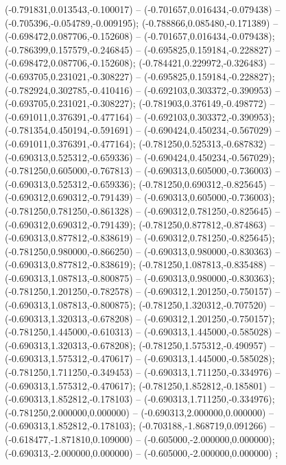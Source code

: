  (-0.791831,0.013543,-0.100017) -- (-0.701657,0.016434,-0.079438) -- (-0.705396,-0.054789,-0.009195);
 (-0.788866,0.085480,-0.171389) -- (-0.698472,0.087706,-0.152608) -- (-0.701657,0.016434,-0.079438);
 (-0.786399,0.157579,-0.246845) -- (-0.695825,0.159184,-0.228827) -- (-0.698472,0.087706,-0.152608);
 (-0.784421,0.229972,-0.326483) -- (-0.693705,0.231021,-0.308227) -- (-0.695825,0.159184,-0.228827);
 (-0.782924,0.302785,-0.410416) -- (-0.692103,0.303372,-0.390953) -- (-0.693705,0.231021,-0.308227);
 (-0.781903,0.376149,-0.498772) -- (-0.691011,0.376391,-0.477164) -- (-0.692103,0.303372,-0.390953);
 (-0.781354,0.450194,-0.591691) -- (-0.690424,0.450234,-0.567029) -- (-0.691011,0.376391,-0.477164);
 (-0.781250,0.525313,-0.687832) -- (-0.690313,0.525312,-0.659336) -- (-0.690424,0.450234,-0.567029);
 (-0.781250,0.605000,-0.767813) -- (-0.690313,0.605000,-0.736003) -- (-0.690313,0.525312,-0.659336);
 (-0.781250,0.690312,-0.825645) -- (-0.690312,0.690312,-0.791439) -- (-0.690313,0.605000,-0.736003);
 (-0.781250,0.781250,-0.861328) -- (-0.690312,0.781250,-0.825645) -- (-0.690312,0.690312,-0.791439);
 (-0.781250,0.877812,-0.874863) -- (-0.690313,0.877812,-0.838619) -- (-0.690312,0.781250,-0.825645);
 (-0.781250,0.980000,-0.866250) -- (-0.690313,0.980000,-0.830363) -- (-0.690313,0.877812,-0.838619);
 (-0.781250,1.087813,-0.835488) -- (-0.690313,1.087813,-0.800875) -- (-0.690313,0.980000,-0.830363);
 (-0.781250,1.201250,-0.782578) -- (-0.690312,1.201250,-0.750157) -- (-0.690313,1.087813,-0.800875);
 (-0.781250,1.320312,-0.707520) -- (-0.690313,1.320313,-0.678208) -- (-0.690312,1.201250,-0.750157);
 (-0.781250,1.445000,-0.610313) -- (-0.690313,1.445000,-0.585028) -- (-0.690313,1.320313,-0.678208);
 (-0.781250,1.575312,-0.490957) -- (-0.690313,1.575312,-0.470617) -- (-0.690313,1.445000,-0.585028);
 (-0.781250,1.711250,-0.349453) -- (-0.690313,1.711250,-0.334976) -- (-0.690313,1.575312,-0.470617);
 (-0.781250,1.852812,-0.185801) -- (-0.690313,1.852812,-0.178103) -- (-0.690313,1.711250,-0.334976);
 (-0.781250,2.000000,0.000000) -- (-0.690313,2.000000,0.000000) -- (-0.690313,1.852812,-0.178103);
 (-0.703188,-1.868719,0.091266) -- (-0.618477,-1.871810,0.109000) -- (-0.605000,-2.000000,0.000000);
 (-0.690313,-2.000000,0.000000) -- (-0.605000,-2.000000,0.000000) ;
